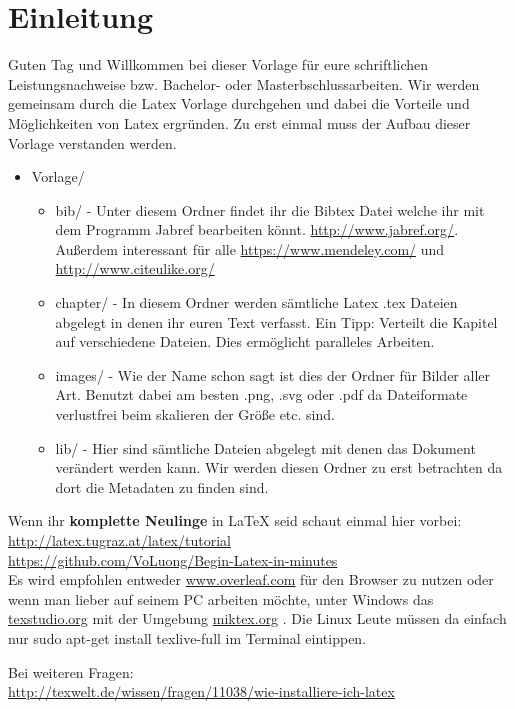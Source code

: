 \chapter{Einleitung}
Guten Tag und Willkommen bei dieser Vorlage für eure schriftlichen Leistungsnachweise bzw. Bachelor- oder Masterbschlussarbeiten. Wir werden gemeinsam durch die Latex Vorlage durchgehen und dabei die Vorteile und Möglichkeiten von Latex ergründen. Zu erst einmal muss der Aufbau dieser Vorlage verstanden werden.

\begin{itemize}
	\item Vorlage/
		\begin{itemize}
			\item bib/ - Unter diesem Ordner findet ihr die Bibtex Datei welche ihr mit dem Programm Jabref bearbeiten könnt. \url{http://www.jabref.org/}. Außerdem interessant für alle \url{https://www.mendeley.com/} und \url{http://www.citeulike.org/}
			\item chapter/ - In diesem Ordner werden sämtliche Latex .tex Dateien abgelegt in denen ihr euren Text verfasst. Ein Tipp: Verteilt die Kapitel auf verschiedene Dateien. Dies ermöglicht paralleles Arbeiten.
			\item images/ - Wie der Name schon sagt ist dies der Ordner für Bilder aller Art. Benutzt dabei am besten .png, .svg oder .pdf da Dateiformate verlustfrei beim skalieren der Größe etc. sind.
			\item lib/ - Hier sind sämtliche Dateien abgelegt mit denen das Dokument verändert werden kann. Wir werden diesen Ordner zu erst betrachten da dort die Metadaten zu finden sind. 
		\end{itemize}
\end{itemize}

Wenn ihr \textbf{komplette Neulinge} in LaTeX seid schaut einmal hier vorbei: \\\url{http://latex.tugraz.at/latex/tutorial}\\
\url{https://github.com/VoLuong/Begin-Latex-in-minutes}\\

Es wird empfohlen entweder \url{www.overleaf.com} für den Browser zu nutzen oder wenn man lieber auf seinem PC arbeiten möchte, unter Windows das \url{texstudio.org} mit der Umgebung \url{miktex.org} . Die Linux Leute müssen da einfach nur sudo apt-get install texlive-full im Terminal eintippen. 

Bei weiteren Fragen:\\
\url{http://texwelt.de/wissen/fragen/11038/wie-installiere-ich-latex}
